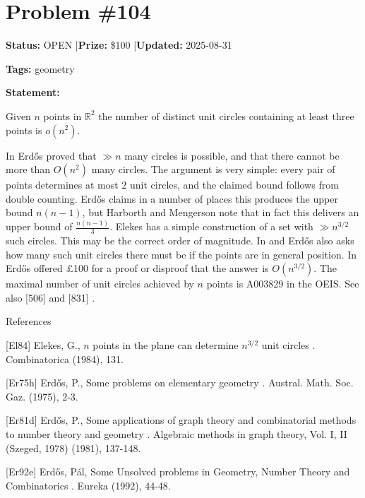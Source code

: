 \documentclass{article}
\begin{document}
\section{Problem \#104}
\label{prob:104}

\noindent\textbf{Status:} OPEN \quad|\quad \textbf{Prize:} \$100 \quad|\quad \textbf{Updated:} 2025-08-31

\noindent\textbf{Tags:} geometry

\medskip

\noindent\textbf{Statement:}

Given $n$ points in $\mathbb{R}^2$ the number of distinct unit circles containing at least three points is $o(n^2)$.




In \cite{Er81d} Erd\H{o}s proved that $\gg n$ many circles is possible, and that there cannot be more than $O(n^2)$ many circles. The argument is very simple: every pair of points determines at most $2$ unit circles, and the claimed bound follows from double counting. Erd\H{o}s claims in a number of places this produces the upper bound $n(n-1)$, but Harborth and Mengerson \cite{HaMe86} note that in fact this delivers an upper bound of $\frac{n(n-1)}{3}$. Elekes \cite{El84} has a simple construction of a set with $\gg n^{3/2}$ such circles. This may be the correct order of magnitude. In \cite{Er75h} and \cite{Er92e} Erd\H{o}s also asks how many such unit circles there must be if the points are in general position. In \cite{Er92e} Erd\H{o}s offered £100 for a proof or disproof that the answer is $O(n^{3/2})$. The maximal number of unit circles achieved by $n$ points is A003829 in the OEIS. See also [506] and [831] .




References

[El84] Elekes, G., {$n$} points in the plane can determine $n^{3/2}$ unit circles . Combinatorica (1984), 131.

[Er75h] Erd\H{o}s, P., Some problems on elementary geometry . Austral. Math. Soc. Gaz. (1975), 2-3.

[Er81d] Erd\H{o}s, P., Some applications of graph theory and combinatorial methods to number theory and geometry . Algebraic methods in graph theory, Vol. I, II (Szeged, 1978) (1981), 137-148.

[Er92e] Erd\H{o}s, P\'{a}l, Some Unsolved problems in Geometry, Number Theory and Combinatorics . Eureka (1992), 44-48.
\end{document}

